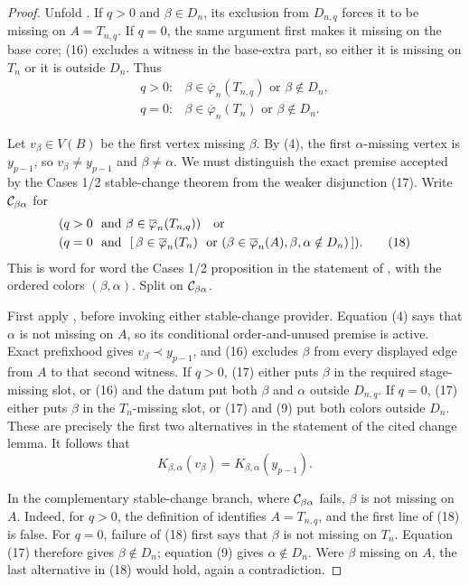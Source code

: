 \begin{proof}
Unfold .  If \(q>0\) and
\(\beta\in D_n\), its exclusion from \(D_{n,q}\) forces it to be
missing on \(A=T_{n,q}\).  If \(q=0\), the same argument first makes
it missing on the base core; (16) excludes a witness in the base-extra
part, so either it is missing on \(T_n\) or it is outside \(D_n\).
Thus
\[
 \begin{array}{ll}
 q>0:&\beta\in\overline\varphi_n(T_{n,q})\text{ or }\beta\notin D_n,\\
 q=0:&\beta\in\overline\varphi_n(T_n)\text{ or }\beta\notin D_n.
 \end{array}                                                  \tag{17}
\]

Let \(v_\beta\in V(B)\) be the first vertex missing \(\beta\).  By
(4), the first \(\alpha\)-missing vertex is \(y_{p-1}\), so
\(v_\beta\ne y_{p-1}\) and \(\beta\ne\alpha\).  We must distinguish
the exact premise accepted by the Cases 1/2 stable-change theorem from
the weaker disjunction (17).  Write \({\cal C}_{\beta\alpha}\) for
\[
 \begin{split}
 &(q>0\ \hbox{ and }
       \beta\in\overline\varphi_n(T_{n,q}))\quad\hbox{or}\\
 &(q=0\ \hbox{ and }\ [\,
       \beta\in\overline\varphi_n(T_n)\ \hbox{ or }
       (\beta\in\overline\varphi_n(A),
        \beta,\alpha\notin D_n)\,]).                       \tag{18}
 \end{split}
\]
This is word for word the Cases 1/2 proposition in the statement of
, with the ordered colors
\((\beta,\alpha)\).  Split on \({\cal C}_{\beta\alpha}\).

First apply , before invoking either stable-change
provider.  Equation (4) says that \(\alpha\) is not missing on \(A\),
so its conditional order-and-unused premise is active.  Exact
prefixhood gives \(v_\beta\prec y_{p-1}\), and (16) excludes \(\beta\)
from every displayed edge from \(A\) to that second witness.  If
\(q>0\), (17) either puts \(\beta\) in the required stage-missing slot,
or (16) and the datum put both \(\beta\) and \(\alpha\) outside
\(D_{n,q}\).  If \(q=0\), (17) either puts \(\beta\) in the
\(T_n\)-missing slot, or (17) and (9) put both colors outside \(D_n\).
These are precisely the first two alternatives in the statement of the
cited change lemma.  It follows that
\[
        K_{\beta,\alpha}(v_\beta)
             =K_{\beta,\alpha}(y_{p-1}).                    \tag{20}
\]

In the complementary stable-change branch, where
\({\cal C}_{\beta\alpha}\) fails, \(\beta\) is not missing on \(A\).
Indeed, for \(q>0\), the definition of
 identifies \(A=T_{n,q}\), and the first
line of (18) is false.  For \(q=0\), failure of (18) first says that
\(\beta\) is not missing on \(T_n\).  Equation (17) therefore gives
\(\beta\notin D_n\); equation (9) gives \(\alpha\notin D_n\).  Were
\(\beta\) missing on \(A\), the last alternative in (18) would hold,
again a contradiction.


\end{proof}
